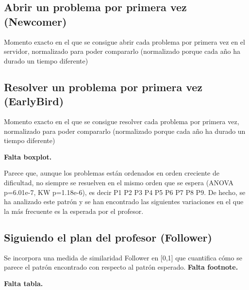 \subsection{Abrir un problema por primera vez (Newcomer)}

Momento exacto en el que se consigue abrir cada problema por primera vez en el servidor, normalizado para poder compararlo (normalizado porque cada año ha durado  un tiempo diferente)

\subsection{Resolver un problema por primera vez (EarlyBird)}

Momento exacto en el que se consigue resolver cada problema por primera vez, normalizado para poder compararlo (normalizado porque cada año ha durado  un tiempo diferente)

\textbf{Falta boxplot.}

Parece que, aunque los problemas están ordenados en orden creciente de dificultad, no siempre se resuelven en el mismo orden que se espera (ANOVA p=6.01e-7, KW p=1.18e-6), es decir P1 P2 P3 P4 P5 P6 P7 P8 P9. De hecho, se ha analizado este patrón y se han encontrado las siguientes variaciones en el que la más frecuente es la esperada por el profesor.

\subsection{Siguiendo el plan del profesor (Follower)}

Se incorpora una medida de similaridad Follower en [0,1] que cuantifica cómo se parece el patrón encontrado con respecto al patrón esperado. \textbf{Falta footnote.}

\textbf{Falta tabla.}